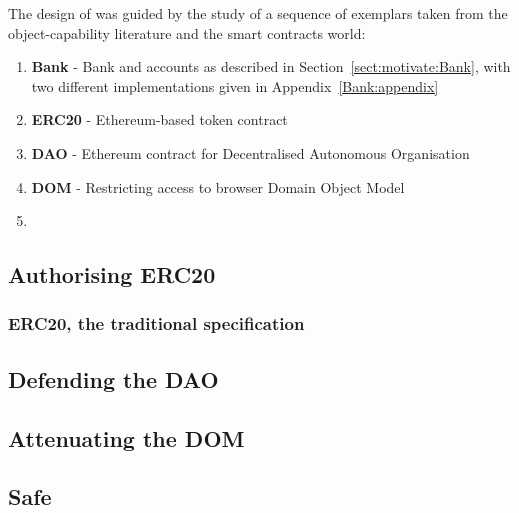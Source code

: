 


The design of \Chainmail was guided by the study of a sequence of
exemplars taken from the object-capability literature and the smart
contracts world:

\begin{enumerate}
\item \textbf{Bank} \cite{arnd18} - Bank and accounts as described in
Section~\ref{sect:motivate:Bank}, with two different implementations given in Appendix~\ref{Bank:appendix}
\item
\textbf{ERC20} \cite{ERC20} - Ethereum-based token contract
\item
\textbf{DAO} \cite{Dao,DaoBug} - Ethereum contract for Decentralised Autonomous
Organisation
\item
\textbf{DOM} \cite{dd,ddd} - Restricting access to browser Domain Object Model\\
\item
{}\\
\end{enumerate}\vspace{-1em}

\subsection{Authorising ERC20}
\label{sect:example:ERC20}
{}

\subsubsection{ERC20, the traditional specification}
\label{ERC20:cont}


\subsection{Defending the DAO}
\label{Dao:appendix}


\subsection{Attenuating the DOM}
\label{sect:example:DOM}


\subsection{Safe}
\label{sect:exampleSafe}


